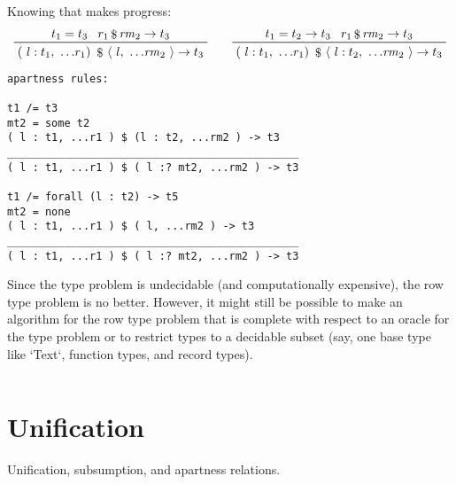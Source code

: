 \documentclass[11pt, twoside, reqno]{book}
\providecommand{\lcurvyangle}{\langle}
\providecommand{\rcurvyangle}{\rangle}
\begin{document}
Knowing that makes progress:
\begin{displaymath}
\prftree{t_1 = t_3}{r_1 \mathop{\$} \mathit{rm}_2 \to t_3}
  {(\ l : t_1,\ \dots\!r_1 )\ \mathop{\$}\ \lcurvyangle\ l,\ \dots\!\mathit{rm}_2\ \rcurvyangle \to t_3}
\qquad
\prftree{t_1 = t_2 \to t_3}{r_1 \mathop{\$} \mathit{rm}_2 \to t_3}
  {(\ l : t_1,\ \dots\!r_1 )\ \mathop{\$}\ \lcurvyangle\ l : t_2,\ \dots\!\mathit{rm}_2\ \rcurvyangle \to t_3}
\end{displaymath}

\begin{verbatim}
apartness rules:

t1 /= t3
mt2 = some t2
( l : t1, ...r1 ) $ (l : t2, ...rm2 ) -> t3
______________________________________________
( l : t1, ...r1 ) $ ( l :? mt2, ...rm2 ) -> t3

t1 /= forall (l : t2) -> t5
mt2 = none
( l : t1, ...r1 ) $ ( l, ...rm2 ) -> t3
______________________________________________
( l : t1, ...r1 ) $ ( l :? mt2, ...rm2 ) -> t3
\end{verbatim}


%
%
%
%

Since the type problem is undecidable (and computationally expensive), the row type problem is no better.
However, it might still be possible to make an algorithm for the row type problem that is complete with respect to an oracle for the type problem or to restrict types to a decidable subset (say, one base type like \inHS`Text`, function types, and record types).

\begin{displaymath}
\end{displaymath}






\chapter{Unification}
Unification, subsumption, and apartness relations.
\end{document}
